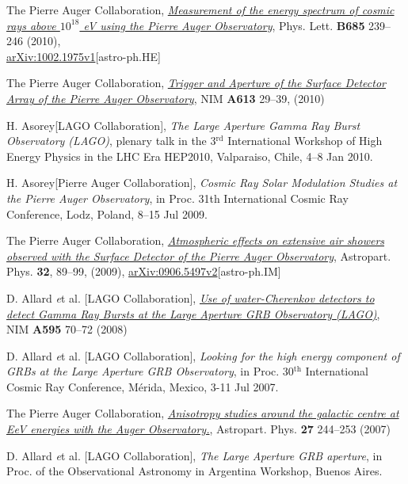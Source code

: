 \documentclass[11pt, a4paper]{article}
\newcommand{\years}[1]{\marginnote{\scriptsize #1}}
\begin{document}
\begin{etaremune}
\item \years{2010}The Pierre Auger Collaboration,
\href{http://dx.doi.org/10.1016/j.physletb.2010.02.013}{\emph{Measurement of
the energy spectrum of cosmic rays above $10^{18}$ eV using the Pierre Auger
Observatory}}, Phys. Lett. {\bf B685} 239--246 (2010),\\
\href{http://arxiv.org/abs/1002.1975}{arXiv:1002.1975v1}[astro-ph.HE]

\item \years{2010}The Pierre Auger Collaboration,
\href{http://dx.doi.org/10.1016/j.nima.2009.11.018}{\emph{Trigger and Aperture
of the Surface Detector Array of the Pierre Auger Observatory}}, NIM {\bf A613}
29--39, (2010)

\item \years{2010}H. Asorey[LAGO Collaboration], {\emph{The Large Aperture Gamma Ray
Burst Observatory (LAGO)}}, plenary talk in the 3$^{\mathrm{rd}}$ International Workshop of
High Energy Physics in the LHC Era HEP2010, Valparaiso, Chile, 4--8 Jan 2010.

\item \years{2009}H. Asorey[Pierre Auger Collaboration], {\emph{Cosmic Ray Solar
Modulation Studies at the Pierre Auger Observatory}}, in Proc. 31th
International Cosmic Ray Conference, Lodz, Poland, 8--15 Jul 2009.

\item \years{2009} The Pierre Auger Collaboration,
\href{http://dx.doi.org/10.1016/j.astropartphys.2009.06.004}{\emph{Atmospheric
effects on extensive air showers observed with the Surface Detector of the
Pierre Auger Observatory}}, Astropart. Phys. {\bf 32}, 89--99, (2009),
\href{http://arxiv.org/abs/0906.5497/}{arXiv:0906.5497v2}[astro-ph.IM]

\item \years{2008}D. Allard {\emph et al.} [LAGO Collaboration],
\href{http://dx.doi.org/10.1016/j.nima.2008.07.041}{\emph{Use of
water-Cherenkov detectors to detect Gamma Ray Bursts at the Large Aperture GRB
Observatory (LAGO)}}, NIM {\bf A595} 70--72 (2008)

\item \years{2007}D. Allard {\emph et al.} [LAGO Collaboration], {\emph{Looking for
the high energy component of GRBs at the Large Aperture GRB Observatory}}, in
Proc. 30$^{\mathrm{th}}$ International Cosmic Ray Conference,  Mérida, Mexico, 3-11 Jul
2007.

\item \years{2007}The Pierre Auger Collaboration,
\href{http://dx.doi.org/10.1016/j.astropartphys.2006.11.002}{\emph{Anisotropy
studies around the galactic centre at EeV energies with the Auger
Observatory.}},  Astropart. Phys. {\bf 27} 244--253 (2007)

\item \years{2006}D. Allard {\emph et al.} [LAGO Collaboration], {\emph{The Large
Aperture GRB aperture}}, in Proc. of the Observational Astronomy in Argentina
Workshop, Buenos Aires.

\end{etaremune}
\end{document}
